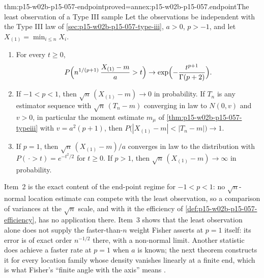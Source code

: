 \begin{hbtheorem}{thm:p15-w02b-p15-057-endpoint}{proved=annex:p15-w02b-p15-057.endpoint}{The least observation of a Type III sample}
Let the observations be independent with the Type III law of
\cref{sec:p15-w02b-p15-057-type-iii}, \(a>0\), \(p>-1\), and let
\(X_{(1)}=\min_{i\leq n}X_i\).
\begin{enumerate}
\item For every \(t\geq0\),
 \[
  P\Bigl(n^{1/(p+1)}\,\frac{X_{(1)}-m}{a}>t\Bigr)\to
  \exp\Bigl(-\frac{t^{p+1}}{\Gamma(p+2)}\Bigr).
 \]
\item If \(-1<p<1\), then \(\sqrt n\,(X_{(1)}-m)\to0\) in probability. If
 \(T_n\) is any estimator sequence with
 \(\sqrt n\,(T_n-m)\) converging in law to \(N(0,v)\) and \(v>0\), in particular the
 moment estimate \(m_\mu\) of \cref{thm:p15-w02b-p15-057-typeiii} with
 \(v=a^2(p+1)\), then
 \(P\bigl(|X_{(1)}-m|<|T_n-m|\bigr)\to1\).
\item If \(p=1\), then \(\sqrt n\,(X_{(1)}-m)/a\) converges in law to the
 distribution with \(P(\,\cdot>t)=e^{-t^2/2}\) for \(t\geq0\). If \(p>1\),
 then \(\sqrt n\,(X_{(1)}-m)\to\infty\) in probability.
\end{enumerate}
\end{hbtheorem}

Item~2 is the exact content of the end-point regime for \(-1<p<1\): no
\(\sqrt n\)-normal location estimate can compete with the least
observation, so a comparison of variances at the \(\sqrt n\) scale, and
with it the efficiency of \cref{def:p15-w02b-p15-057-efficiency}, has no
application there. Item~3 shows that the least observation alone does not
supply the faster-than-\(n\) weight Fisher asserts at \(p=1\) itself: its
error is of exact order \(n^{-1/2}\) there, with a non-normal limit. Another
statistic does achieve a faster rate at \(p=1\) when \(a\) is known; the
next theorem constructs it for every location family whose density
vanishes linearly at a finite end, which is what Fisher's ``finite angle
with the axis'' means \cite[p.~347]{Fisher1922Foundations}.

